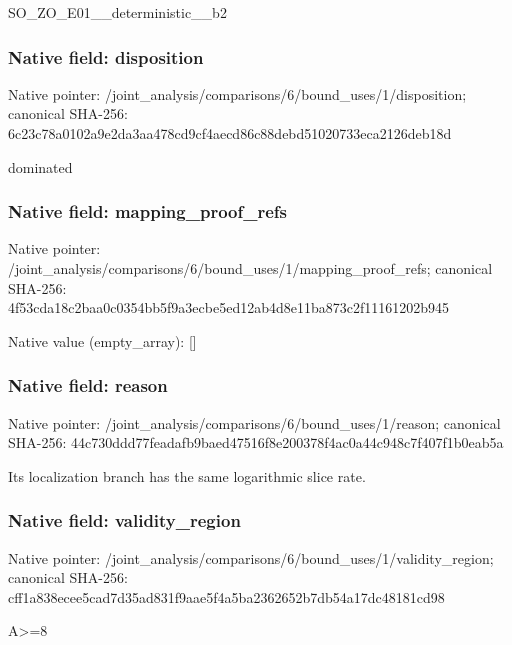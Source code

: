 \documentclass[10pt,a4paper]{article}
\begin{document}
\begingroup\raggedright\sloppy SO\_\allowbreak{}ZO\_\allowbreak{}E01\_\allowbreak{}\_\allowbreak{}deterministic\_\allowbreak{}\_\allowbreak{}b2\par\endgroup

\subsubsection{Native field: disposition}
Native pointer: /joint\_\allowbreak{}analysis/comparisons/6/bound\_\allowbreak{}uses/1/disposition; canonical SHA-256: 6c23c78a0102a9e2da3aa478cd9cf4aecd86c88debd51020733eca2126deb18d

\begingroup\raggedright\sloppy dominated\par\endgroup

\subsubsection{Native field: mapping\_\allowbreak{}proof\_\allowbreak{}refs}
Native pointer: /joint\_\allowbreak{}analysis/comparisons/6/bound\_\allowbreak{}uses/1/mapping\_\allowbreak{}proof\_\allowbreak{}refs; canonical SHA-256: 4f53cda18c2baa0c0354bb5f9a3ecbe5ed12ab4d8e11ba873c2f11161202b945

Native value (empty\_\allowbreak{}array): []

\subsubsection{Native field: reason}
Native pointer: /joint\_\allowbreak{}analysis/comparisons/6/bound\_\allowbreak{}uses/1/reason; canonical SHA-256: 44c730ddd77feadafb9baed47516f8e200378f4ac0a44c948c7f407f1b0eab5a

\begingroup\raggedright\sloppy Its localization branch has the same logarithmic slice rate.\par\endgroup

\subsubsection{Native field: validity\_\allowbreak{}region}
Native pointer: /joint\_\allowbreak{}analysis/comparisons/6/bound\_\allowbreak{}uses/1/validity\_\allowbreak{}region; canonical SHA-256: cff1a838ecee5cad7d35ad831f9aae5f4a5ba2362652b7db54a17dc48181cd98

\begingroup\raggedright\sloppy A>=\allowbreak{}8\par\endgroup
\end{document}
